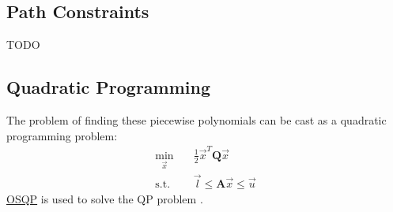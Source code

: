 \documentclass[12pt]{article}
\begin{document}
\subsection{Path Constraints}
TODO



\subsection{Quadratic Programming}
The problem of finding these piecewise polynomials can be cast as a quadratic
programming problem:
%
\begin{equation}
  \begin{split}
    \min_{\vec{x}} \quad& \frac{1}{2} \vec{x}^T \mathbf{Q} \vec{x}  \\
    \text{s.t.} \quad& \vec{l} \leq \mathbf{A} \vec{x} \leq \vec{u}
  \end{split}
\end{equation}
%
\href{https://osqp.org}{OSQP} is used to solve the QP problem \cite{osqp}.



\end{document}
